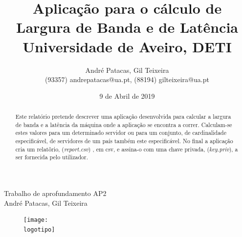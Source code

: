 \documentclass{report}
\begin{document}
%

\def\titulo{Trabalho de aprofundamento AP2}
\def\data{9 de Abril de 2019}
\def\autores{André Patacas, Gil Teixeira}
\def\autorescontactos{(93357) andrepatacas@ua.pt, (88194) gilteixeira@ua.pt}
\def\departamento{Universidade de Aveiro, DETI}
\def\logotipo{ua.pdf}
%
%
\begin{titlepage}

\begin{center}
%
\vspace*{50mm}
%
{\Huge \titulo}\\ 
%
\vspace{10mm}
%
{\LARGE \autores}\\ 
%
\vspace{30mm}
%
\begin{figure}[h]
\center
\texttt{[image: \\logotipo]}
\end{figure}
%
\vspace{30mm}
\end{center}
%
\begin{flushright}

\end{flushright}
\end{titlepage}

\title{%
{\Huge\textbf{Aplicação para o cálculo de Largura de Banda e de Latência}}\\
{\Large \departamento}
}
%
\author{%
    \autores \\
    \autorescontactos 
}

%
\date{\data}
%
\maketitle







\tableofcontents
\listoftables 
\listoffigures  

\clearpage
{}

\begin{abstract}
Este relatório pretende descrever uma aplicação desenvolvida para calcular a largura de banda e a latência da máquina onde a aplicação se encontra a correr. Calculam-se estes valores para um determinado servidor ou para um conjunto, de cardinalidade especificável, de servidores de um país também este especificável. No final a aplicação cria um relatõrio, (\textit{report.csv}) , em csv, e assina-o com uma chave privada, (\textit{key.priv}), a ser fornecida pelo utilizador.

\end{abstract}
\end{document}
